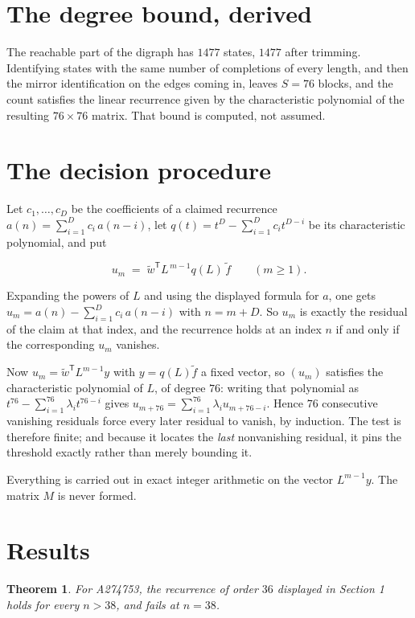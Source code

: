 \documentclass[11pt]{article}
\newtheorem{theorem}{Theorem}
\theoremstyle{definition}
\begin{document}
\section{The degree bound, derived}

The reachable part of the digraph has $1477$ states, $1477$ after trimming. Identifying states with the same number of completions of every length, and then the mirror identification on the edges coming in, leaves $S = 76$ blocks, and the count satisfies the linear recurrence given by the characteristic polynomial of the resulting $76\times76$ matrix. That bound is computed, not assumed.

\section{The decision procedure}

Let $c_1,\dots,c_D$ be the coefficients of a claimed recurrence $a(n) = \sum_{i=1}^{D} c_i\,a(n-i)$, let $q(t) = t^{D} - \sum_{i=1}^{D} c_i t^{D-i}$ be its characteristic polynomial, and put

\[u_m \;=\; \tilde w^{\mathsf T} L^{\,m-1} q(L)\,\tilde f \qquad (m \ge 1).\]

Expanding the powers of $L$ and using the displayed formula for $a$, one gets $u_m = a(n) - \sum_{i=1}^{D} c_i\,a(n-i)$ with $n = m + D$. So $u_m$ is exactly the residual of the claim at that index, and the recurrence holds at an index $n$ if and only if the corresponding $u_m$ vanishes.

Now $u_m = \tilde w^{\mathsf T} L^{m-1} y$ with $y = q(L)\tilde f$ a fixed vector, so $(u_m)$ satisfies the characteristic polynomial of $L$, of degree $76$: writing that polynomial as $t^{76} - \sum_{i=1}^{76} \lambda_i t^{76-i}$ gives $u_{m+76} = \sum_{i=1}^{76} \lambda_i u_{m+76-i}$. Hence $76$ consecutive vanishing residuals force every later residual to vanish, by induction. The test is therefore finite; and because it locates the {\itshape last} nonvanishing residual, it pins the threshold exactly rather than merely bounding it.

Everything is carried out in exact integer arithmetic on the vector $L^{m-1}y$. The matrix $M$ is never formed.

\section{Results}

\begin{theorem} For A274753, the recurrence of order $36$ displayed in Section 1 holds for every $n > 38$, and fails at $n = 38$.\end{theorem}
\end{document}
